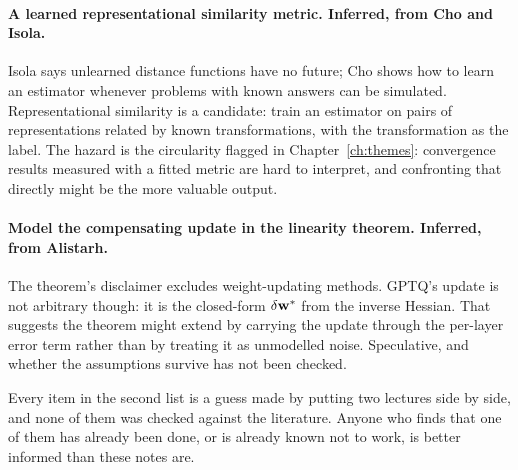 \paragraph{A learned representational similarity metric. Inferred, from Cho and Isola.} Isola says
unlearned distance functions have no future; Cho shows how to learn an estimator whenever problems
with known answers can be simulated. Representational similarity is a candidate: train an estimator
on pairs of representations related by known transformations, with the transformation as the label.
The hazard is the circularity flagged in Chapter~\ref{ch:themes}: convergence results measured with
a fitted metric are hard to interpret, and confronting that directly might be the more valuable
output.

\paragraph{Model the compensating update in the linearity theorem. Inferred, from Alistarh.} The
theorem's disclaimer excludes weight-updating methods. GPTQ's update is not arbitrary though: it is
the closed-form $\delta\mathbf{w}^{*}$ from the inverse Hessian. That suggests the theorem might extend by
carrying the update through the per-layer error term rather than by treating it as unmodelled noise.
Speculative, and whether the assumptions survive has not been checked.

\begin{aside}
Every item in the second list is a guess made by putting two lectures side by side, and none of them
was checked against the literature. Anyone who finds that one of them has already been done, or is
already known not to work, is better informed than these notes are.
\end{aside}
